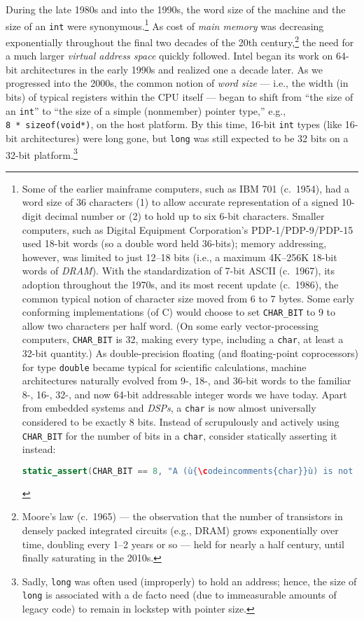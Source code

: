 During the late 1980s and into the 1990s, the word size of the machine and
the size of an \texttt{int} were synonymous.{\cprotect\footnote{Some of
the earlier mainframe computers, such as IBM 701 (c.~1954), had a word
size of 36 characters (1) to allow accurate representation of a signed
10-digit decimal number or (2) to hold up to six 6-bit characters.
Smaller computers, such as Digital Equipment Corporation's
PDP-1/PDP-9/PDP-15 used 18-bit words (so a double word held 36-bits);
memory addressing, however, was limited to just 12--18 bits (i.e., a
maximum 4K--256K 18-bit words of \emph{DRAM}). With the standardization
of 7-bit ASCII (c.~1967), its adoption throughout the 1970s, and its most
recent update (c.~1986), the common typical notion of character size
moved from 6 to 7 bytes. Some early conforming implementations (of C)
would choose to set \texttt{CHAR\_BIT} to 9 to allow two characters
per half word. (On some early vector-processing computers,
\texttt{CHAR\_BIT} is 32, making every type, including a
\texttt{char}, at least a 32-bit quantity.) As double-precision
floating (and floating-point coprocessors) for type \texttt{double}
became typical for scientific calculations, machine architectures
naturally evolved from 9-, 18-, and 36-bit words to the familiar 8-,
16-, 32-, and now 64-bit addressable integer words we have today.
Apart from embedded systems and \emph{DSPs}, a \texttt{char} is now
almost universally considered to be exactly 8 bits. Instead of
scrupulously and actively using \texttt{CHAR\_BIT} for the number of bits
in a \texttt{char}, consider statically asserting it instead:

\begin{lstlisting}[language=C++, basicstyle={\ttfamily\footnotesize}]
static_assert(CHAR_BIT == 8, "A (ù{\codeincomments{char}}ù) is not 8-bits on this CrAzY platform!");
\end{lstlisting}\vspace*{-1ex}
}} As cost of \emph{main memory} was decreasing exponentially
throughout the final two decades of the 20th
century,{\cprotect\footnote{Moore's law (c.~1965) --- the observation
that the number of transistors in densely packed integrated circuits
(e.g., DRAM) grows exponentially over time, doubling every 1--2 years
or so --- held for nearly a half century, until finally saturating in
the 2010s.}} the need for a much larger \emph{virtual address space}
quickly followed. Intel began its work on 64-bit architectures in the
early 1990s and realized one a decade later. As we progressed into
the 2000s, the common notion of \emph{word size} --- i.e., the width (in
bits) of typical registers within the CPU itself --- began to shift from
``the size of an \texttt{int}'' to ``the size of a simple (nonmember)
pointer type,'' e.g., \texttt{8}~\texttt{*}~\texttt{sizeof(void*)}, on the host platform. By this time, 16-bit \texttt{int} types (like
16-bit architectures) were long gone, but \texttt{long} was still
expected to be 32 bits on a 32-bit platform.{\cprotect\footnote{Sadly,
\texttt{long} was often used (improperly) to hold an address; hence,
the size of {\tt long} is associated with a de facto need (due to immeasurable amounts of legacy code) to remain in lockstep with pointer size.}}

